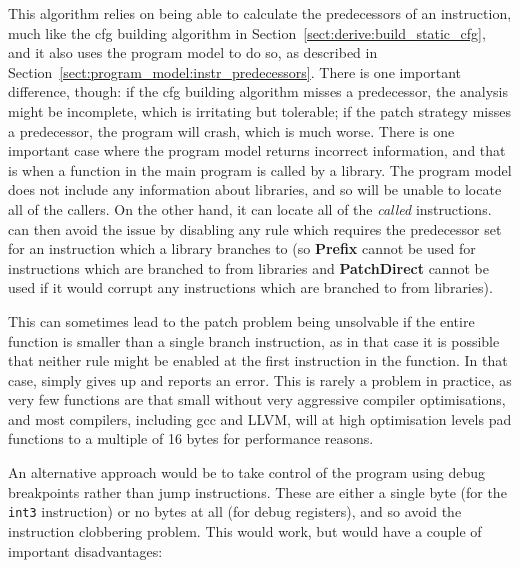 This algorithm relies on being able to calculate the predecessors of
an instruction, much like the \gls{cfg} building algorithm in
Section~\ref{sect:derive:build_static_cfg}, and it also uses the
program model to do so, as described in
Section~\ref{sect:program_model:instr_predecessors}.  There is one
important difference, though: if the \gls{cfg} building algorithm
misses a predecessor, the analysis might be incomplete, which is
irritating but tolerable; if the patch strategy misses a predecessor,
the program will crash, which is much worse.  There is one important
case where the program model returns incorrect information, and that
is when a function in the main program is called by a library.  The
program model does not include any information about libraries, and so
will be unable to locate all of the callers.  On the other hand, it
can locate all of the \emph{called} instructions.  {\Technique} can
then avoid the issue by disabling any rule which requires the
predecessor set for an instruction which a library branches to (so
\textbf{Prefix} cannot be used for instructions which are branched to
from libraries and \textbf{PatchDirect} cannot be used if it would
corrupt any instructions which are branched to from libraries).

This can sometimes lead to the patch problem being unsolvable if the
entire function is smaller than a single branch instruction, as in
that case it is possible that neither rule might be enabled at the
first instruction in the function.  In that case, {\implementation}
simply gives up and reports an error.  This is rarely a problem in
practice, as very few functions are that small without very aggressive
compiler optimisations, and most compilers, including
gcc\cite[Section~3.10]{Stallman2010} and LLVM\needCite{}, will at high
optimisation levels pad functions to a multiple of 16 bytes for
performance reasons.

An alternative approach would be to take control of the program using
debug breakpoints rather than jump instructions.  These are either a
single byte (for the \verb|int3| instruction) or no bytes at all (for
debug registers), and so avoid the instruction clobbering problem.
This would work, but would have a couple of important disadvantages:

